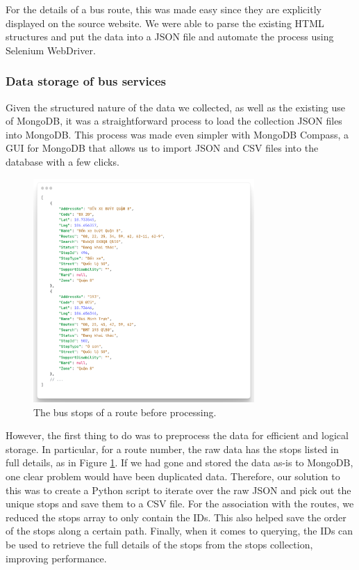 For the details of a bus route, this was made easy since they are explicitly displayed on the source website. We were able to parse the existing HTML structures and put the data into a JSON file and automate the process using Selenium WebDriver.

\subsubsection{Data storage of bus services}
Given the structured nature of the data we collected, as well as the existing use of MongoDB, it was a straightforward process to load the collection JSON files into MongoDB. This process was made even simpler with MongoDB Compass, a GUI for MongoDB that allows us to import JSON and CSV files into the database with a few clicks.

\begin{figure}
    \centering
    \includegraphics[width=0.75\textwidth]{assets/images/Implementation/raw_stops.png}
    \caption{The bus stops of a route before processing.}
    \label{fig:raw_stops}
\end{figure}

However, the first thing to do was to preprocess the data for efficient and logical storage. In particular, for a route number, the raw data has the stops listed in full details, as in Figure \ref{fig:raw_stops}. If we had gone and stored the data as-is to MongoDB, one clear problem would have been duplicated data. Therefore, our solution to this was to create a Python script to iterate over the raw JSON and pick out the unique stops and save them to a CSV file. For the association with the routes, we reduced the stops array to only contain the IDs. This also helped save the order of the stops along a certain path. Finally, when it comes to querying, the IDs can be used to retrieve the full details of the stops from the stops collection, improving performance.


